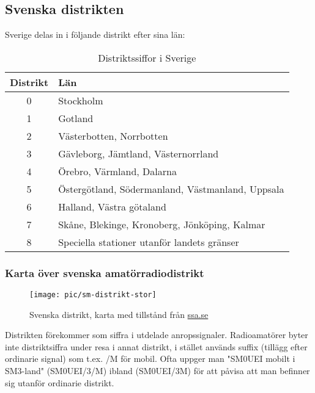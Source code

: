 \subsection{Svenska distrikten}

Sverige delas in i följande distrikt efter sina län:

\begin{table}[h]
	\centering
\begin{tabular}{cl}
	\textbf{Distrikt} & \textbf{Län}                                     \\ \hline %
	      0        & Stockholm                                        \\
	      1        & Gotland                                          \\
	      2        & Västerbotten, Norrbotten                         \\
	      3        & Gävleborg, Jämtland, Västernorrland              \\
	      4        & Örebro, Värmland, Dalarna                        \\
	      5        & Östergötland, Södermanland, Västmanland, Uppsala \\
	      6        & Halland, Västra götaland                         \\
	      7        & Skåne, Blekinge, Kronoberg, Jönköping, Kalmar    \\
	      8        & Speciella stationer utanför landets gränser
\end{tabular}
\caption{Distriktssiffor i Sverige}
\end{table}

\subsubsection{Karta över svenska amatörradiodistrikt}

\begin{figure}
	\centering
	\texttt{[image: pic/sm-distrikt-stor]}
	\label{fig:sm-distrikt}
	\caption{Svenska distrikt, karta med tillstånd från
          \href{https://SSA.SE}{ssa.se}}
\end{figure}

Distrikten förekommer som siffra i utdelade anropssignaler. Radioamatörer byter
inte distriktsiffra under resa i annat distrikt, i stället används suffix
(tillägg efter ordinarie signal) som t.ex. /M för mobil. Ofta uppger man "SM0UEI
mobilt i SM3-land" (SM0UEI/3/M) ibland (SM0UEI/3M) för att påvisa att man
befinner sig utanför ordinarie distrikt.

